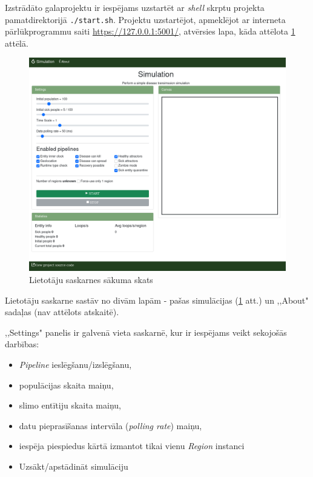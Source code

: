 

Izstrādāto galaprojektu ir iespējams uzstartēt ar \emph{shell} skrptu projekta
pamatdirektorijā \texttt{./start.sh}.
Projektu uzstartējot, apmeklējot ar interneta pārlūkprogrammu saiti
\url{https://127.0.0.1:5001/}, atvērsies lapa, kāda attēlota \ref{img:whole-ui} attēlā.

\begin{figure}[H]
	\centering
	\includegraphics[scale=0.4]{images/ui-whole-page.png}
	\caption{Lietotāju saskarnes sākuma skats}
	\label{img:whole-ui}
\end{figure}

Lietotāju saskarne sastāv no divām lapām - pašas simulācijas (\ref{img:whole-ui}
att.) un ,,About" sadaļas (nav attēlots atskaitē).


,,Settings" panelis ir galvenā vieta saskarnē, kur ir iespējams veikt sekojošās darbības:

\begin{itemize}
    \item \emph{Pipeline} ieslēgšanu/izslēgšanu,
    \item populācijas skaita maiņu,
    \item slimo entītiju skaita maiņu,
    \item datu pieprasīšanas intervāla (\emph{polling rate}) maiņu,
    \item iespēja piespiedus kārtā izmantot tikai vienu \emph{Region} instanci
    \item Uzsākt/apstādināt simulāciju
\end{itemize}

